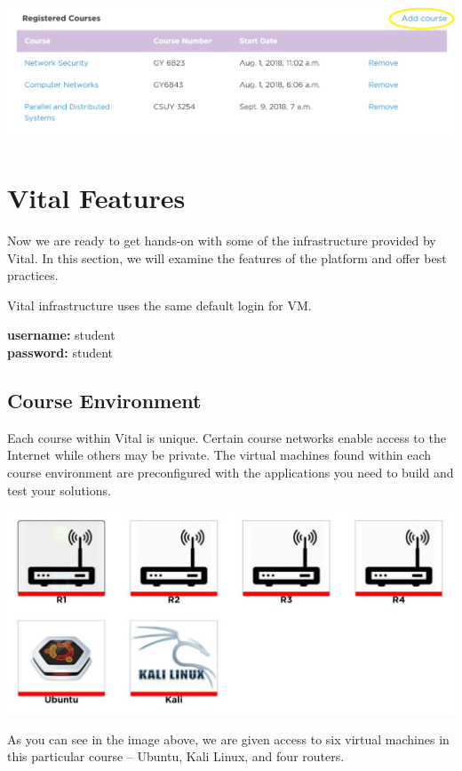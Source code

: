 \documentclass[12pt]{article}
\begin{document}
 
{%
\centering
\includegraphics[width=\linewidth]{course_registration.png}

}

\section*{Vital Features}
Now we are ready to get hands-on with some of the infrastructure provided by Vital. In this section, we will examine the features of the platform and offer best practices. 

Vital infrastructure uses the same default login for VM.
\begin{adjustwidth}{2.5em}{0pt}
\textbf{username:} student\\
\textbf{password:} student
\end{adjustwidth}

\subsection*{Course Environment}
Each course within Vital is unique. Certain course networks enable access to the Internet while others may be private. The virtual machines found within each course environment are preconfigured with the applications you need to build and test your solutions.

\includegraphics[scale=0.50]{course_environment}

As you can see in the image above, we are given access to six virtual machines in this particular course – Ubuntu, Kali Linux, and four routers. 
\end{document}
